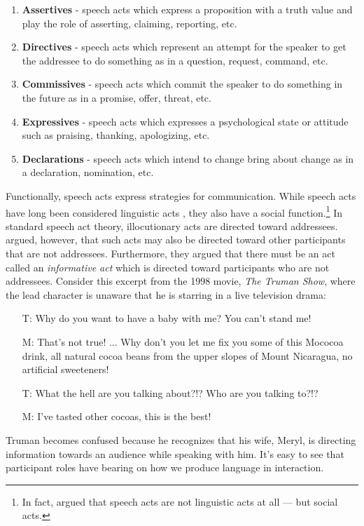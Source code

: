 \begin{enumerate}
\item \textbf{Assertives} - speech acts which express a proposition with a truth value and play the role of asserting, claiming, reporting, etc.
\item \textbf{Directives} - speech acts which represent an attempt for the speaker to get the addressee to do something as in a question, request, command, etc.
\item \textbf{Commissives} - speech acts which commit the speaker to do something in the future as in a promise, offer, threat, etc.
\item \textbf{Expressives} - speech acts which expresses a psychological state or attitude such as praising, thanking, apologizing, etc.
\item \textbf{Declarations} - speech acts which intend to change bring about change as in a declaration, nomination, etc.
\end{enumerate} 

Functionally, speech acts express strategies for communication. While speech acts have long been considered linguistic acts \cite[][and many others]{Searle:1969vw,Levinson:1983ww}, they also have a social function.\footnote{In fact, \cite{Geis:1995vo} argued that speech acts are not linguistic acts at all --- but social acts. } In standard speech act theory, illocutionary acts are directed toward addressees. \cite{Clark:1982tg} argued, however, that such acts may also be directed toward other participants that are not addressees. Furthermore, they argued that there must be an act called an \textit{informative act} which is directed toward participants who are not addressees. Consider this excerpt from the 1998 movie, \textit{The Truman Show}, where the lead character is unaware that he is starring in a live television drama:
\begin{itemize}
\item [T:] Why do you want to have a baby with me? You can't stand me!
\item [M:] That's not true! ... Why don't you let me fix you some of this Mococoa drink, all natural cocoa beans from the upper slopes of Mount Nicaragua, no artificial sweeteners!
\item [T:] What the hell are you talking about?!? Who are you talking to?!?
\item [M:] I've tasted other cocoas, this is the best!
\end{itemize}
Truman becomes confused because he recognizes that his wife, Meryl, is directing information towards an audience while speaking with him. It's easy to see that participant roles have bearing on how we produce language in interaction. 

